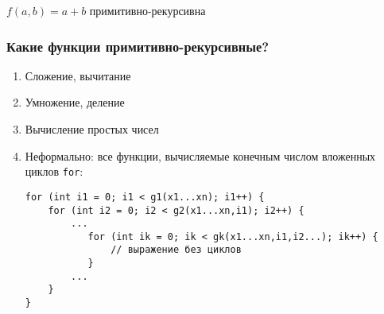 \documentclass[10pt,a4paper,oneside]{article}
\begin{document}
$f(a,b) = a+b$ примитивно-рекурсивна

\subsubsection {Какие функции примитивно-рекурсивные?}
\begin{enumerate}
\item Сложение, вычитание
\item Умножение, деление
\item Вычисление простых чисел
\item Неформально: все функции, вычисляемые конечным числом вложенных циклов \verb!for!:

\begin{verbatim}
for (int i1 = 0; i1 < g1(x1...xn); i1++) {
    for (int i2 = 0; i2 < g2(x1...xn,i1); i2++) {
        ...
           for (int ik = 0; ik < gk(x1...xn,i1,i2...); ik++) {
               // выражение без циклов
           }
        ...
    }
}
\end{verbatim}
\end{enumerate}
\end{document}
